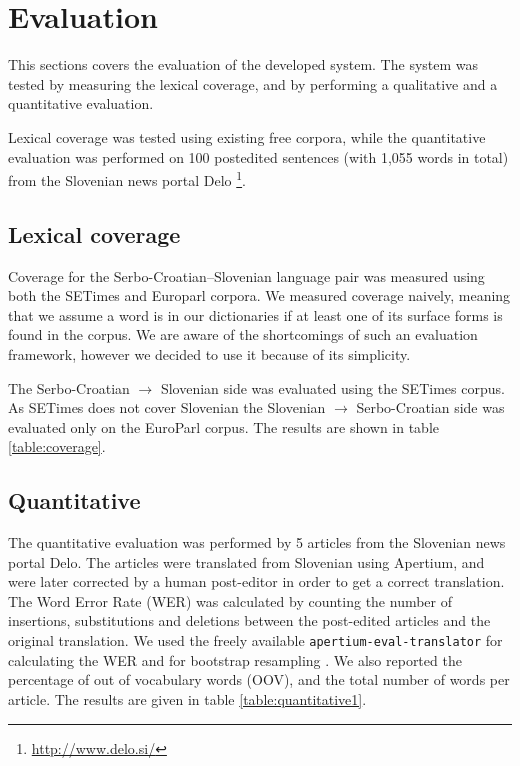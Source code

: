 \section{Evaluation}

This sections covers the evaluation of the developed system. 
The system was tested by measuring the lexical coverage, and by performing
a qualitative and a quantitative evaluation. 

Lexical coverage was tested using existing free corpora, 
while the quantitative evaluation was performed on 100 postedited sentences (with 1,055 words in
total) from the Slovenian news portal 
Delo \footnote{\url{http://www.delo.si/}}.

\subsection{Lexical coverage}

Coverage for the Serbo-Croatian--Slovenian language pair was measured using both the SETimes \cite{tyers2010south} and Europarl \cite{koehn05a} corpora. 
We measured coverage naively, meaning that we assume a word is in our 
dictionaries if at least one of its surface forms is found in the corpus. 
We are aware of the shortcomings of such an evaluation framework, 
however we decided to use it because of its simplicity.

The Serbo-Croatian $\rightarrow$ Slovenian side was evaluated using the SETimes corpus.
As SETimes does not cover Slovenian
the Slovenian $\rightarrow$ Serbo-Croatian side was evaluated only on the EuroParl corpus. The results are shown in table \ref{table:coverage}.

\subsection{Quantitative}

The quantitative evaluation was performed by 5 articles
from the Slovenian news portal Delo.
The articles were translated from Slovenian using Apertium, and were later corrected by a human post-editor in order to get a correct translation.
The Word Error Rate (WER) was calculated
by counting the number of insertions, substitutions and deletions between the post-edited articles
and the original translation. We used the freely available \texttt{apertium-eval-translator} for calculating the WER 
and for bootstrap resampling \cite{koehn04}.
We also reported the percentage of out of vocabulary words (OOV), and the total number of words per article.
The results are given in table \ref{table:quantitative1}.

